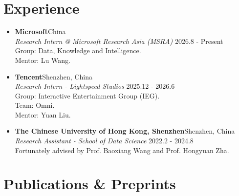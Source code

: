 \documentclass[a4paper,20pt]{article}
\newcommand{\resumeSubheading}[5]{
  \item \textbf{#1}{\hfill #2} \\
        #3 \hfill #4 \\
        #5
}
\newcommand{\resumeSubHeadingListStart}{\begin{itemize}[leftmargin=*]}
\newcommand{\resumeSubHeadingListEnd}{\end{itemize}}
\begin{document}
\vspace{5pt}
\section{Experience}
\vspace{3pt}

\resumeSubHeadingListStart
    \resumeSubheading{Microsoft}{China}
    {\textit{Research Intern @ Microsoft Research Asia (MSRA)}}{2026.8 - Present}
    {Group: Data, Knowledge and Intelligence.\\
    Mentor: Lu Wang.}
    \resumeSubheading{Tencent}{Shenzhen, China}
    {\textit{Research Intern - Lightspeed Studios}}{2025.12 - 2026.6}
    {Group: Interactive Entertainment Group (IEG).\\
    Team: Omni.\\
    Mentor: Yuan Liu.}
    \resumeSubheading{The Chinese University of Hong Kong, Shenzhen}{Shenzhen, China}
    {\textit{Research Assistant - School of Data Science}}{2022.2 - 2024.8}
    {Fortunately advised by Prof. Baoxiang Wang and Prof. Hongyuan Zha.}
\resumeSubHeadingListEnd

\vspace{5pt}
\section{Publications \& Preprints}
\vspace{3pt}
\end{document}
